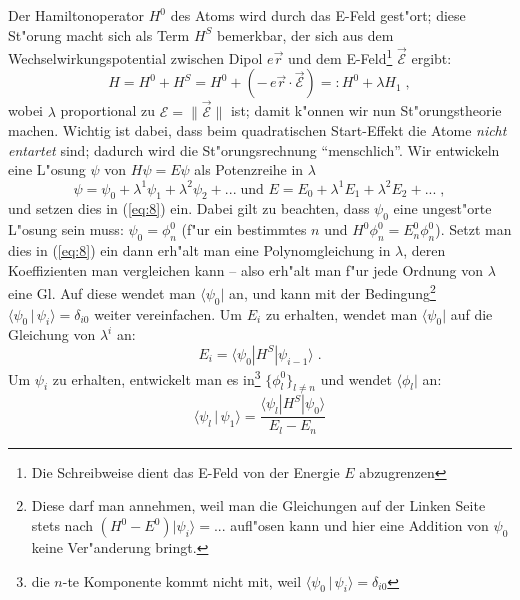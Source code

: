 \documentclass[a4paper,draft]{article}
\begin{document}
Der Hamiltonoperator $H^0$ des Atoms  wird durch
das E-Feld gest"ort; diese St"orung macht sich als Term $H^S$
bemerkbar, der sich aus dem Wechselwirkungspotential zwischen Dipol
$e\vec r$ und dem E-Feld\footnote{Die Schreibweise dient das E-Feld
  von der Energie $E$ abzugrenzen} $\vec {\mathcal E}$ ergibt:
\begin{equation} 
\label{eq:8}
  H = H^0 + H^S = H^0 + (- \, e\vec r \cdot \vec {\mathcal E} ) =: H^0
  + \lambda H_1 \;,
\end{equation}
wobei $\lambda$ proportional zu $\mathcal E = \|\vec {\mathcal E}\|$
ist; damit k"onnen wir nun St"orungstheorie machen. Wichtig ist dabei,
dass beim quadratischen Start-Effekt die Atome \emph{nicht entartet}
sind; dadurch wird die St"orungsrechnung "`menschlich"'. Wir
entwickeln eine L"osung $\psi$ von $H\psi = E\psi$ als Potenzreihe in
$\lambda$ 
\begin{equation*}
  \psi = \psi_0 + \lambda^1 \psi_1 + \lambda^2 \psi_2 + ... \; \text{
    und }
E = E_0 + \lambda^1 E_1 + \lambda^2 E_2 + ... \;,
\end{equation*}
und setzen dies in (\ref{eq:8}) ein. Dabei gilt zu beachten, dass
$\psi_0$ eine ungest"orte L"osung sein muss: $\psi_0 = \phi_n^0$ (f"ur
ein bestimmtes $n$ und $H^0\phi_n^0 = E^0_n\phi_n^0$). Setzt man dies
in (\ref{eq:8}) ein dann erh"alt man eine Polynomgleichung in
$\lambda$, deren Koeffizienten man vergleichen kann -- also erh"alt
man f"ur jede Ordnung von $\lambda$ eine Gl. Auf diese wendet man  $\langle
\psi_0|$ an, und kann
mit der Bedingung\footnote{Diese darf man annehmen, weil man die
  Gleichungen auf der Linken Seite stets nach $(H^0 -
  E^0)|\psi_i\rangle = ...$ aufl"osen kann und hier eine Addition von
  $\psi_0$ keine Ver"anderung bringt.} $\langle \psi_0 \,|\,\psi_i
\rangle = \delta_{i0}$ weiter vereinfachen. Um $E_i$ zu erhalten,
wendet man $\langle \psi_0|$ auf die Gleichung von $\lambda^i$ an:
\begin{equation*}
  E_i = \langle \psi_0 | H^S | \psi_{i-1}  \rangle \;.
\end{equation*}
Um $\psi_i$ zu erhalten, entwickelt man es in\footnote{die $n$-te
  Komponente kommt nicht mit, weil $\langle \psi_0 \,|\,\psi_i
\rangle = \delta_{i0}$} $\{\phi_l^0\}_{l\neq n}$ und
wendet $\langle \phi_l|$ an:
\begin{equation*}
  \langle \psi_l \,|\, \psi_1 \rangle = \frac{\langle \psi_l | H^S | \psi_0
  \rangle}{E_l-E_n}
\end{equation*}
\end{document}
